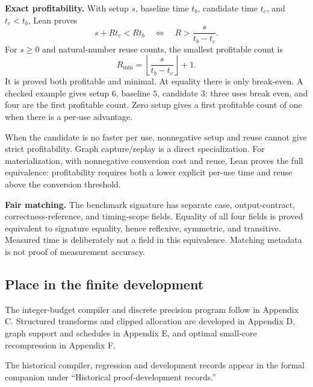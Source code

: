 \textbf{Exact profitability.} With setup $s$, baseline time $t_b$, candidate time $t_c$, and $t_c<t_b$, Lean proves
\[
\boxed{s+Rt_c<Rt_b\quad\Longleftrightarrow\quad
R>\frac{s}{t_b-t_c}.}
\]
For $s\geq0$ and natural-number reuse counts, the smallest profitable count is
\[
\boxed{R_{\min}=\left\lfloor\frac{s}{t_b-t_c}\right\rfloor+1.}
\]
It is proved both profitable and minimal. At equality there is only break-even. A checked example gives setup $6$, baseline $5$, candidate $3$: three uses break even, and four are the first profitable count. Zero setup gives a first profitable count of one when there is a per-use advantage.

When the candidate is no faster per use, nonnegative setup and reuse cannot give strict profitability. Graph capture/replay is a direct specialization. For materialization, with nonnegative conversion cost and reuse, Lean proves the full equivalence: profitability requires both a lower explicit per-use time and reuse above the conversion threshold.

\textbf{Fair matching.} The benchmark signature has separate case, output-contract, correctness-reference, and timing-scope fields. Equality of all four fields is proved equivalent to signature equality, hence reflexive, symmetric, and transitive. Measured time is deliberately not a field in this equivalence. Matching metadata is not proof of measurement accuracy.



\subsection{Place in the finite development}\label{supp2:subsection:007}
The integer-budget compiler and discrete precision program follow in Appendix C. Structured transforms and clipped allocation are developed in Appendix D, graph support and schedules in Appendix E, and optimal small-core recompression in Appendix F.

The historical compiler, regression and development records appear in the formal companion under ``Historical proof-development records.''
